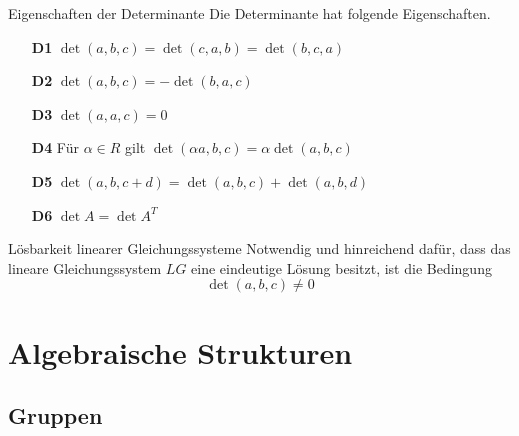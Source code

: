 \documentclass[german]{../spicker}
\begin{document}
\begin{defi}{Eigenschaften der Determinante}
    Die Determinante hat folgende Eigenschaften.
    \begin{itemize}
        \item[\textbf{D1}] $\det(a, b, c) = \det(c, a, b) = \det(b, c, a)$
        \item[\textbf{D2}] $\det(a, b, c) = - \det(b, a, c)$
        \item[\textbf{D3}] $\det(a, a, c) = 0$
        \item[\textbf{D4}] Für $\alpha \in R$ gilt $\det(\alpha a, b, c) = \alpha \det(a, b, c)$
        \item[\textbf{D5}] $\det(a,b, c + d) = \det(a, b, c) + \det(a, b, d)$
        \item[\textbf{D6}] $\det A = \det A^T$
    \end{itemize}
\end{defi}

\begin{bonus}{Lösbarkeit linearer Gleichungssysteme}
    Notwendig und hinreichend dafür, dass das lineare Gleichungssystem $LG$ eine eindeutige Lösung besitzt, ist die Bedingung
    $$
        \det(a, b, c) \neq 0
    $$
\end{bonus}

\newpage
\section{Algebraische Strukturen}
\subsection{Gruppen}
\end{document}
